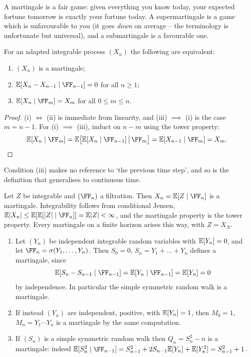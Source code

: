 \documentclass[a4paper]{scrartcl}
\begin{document}
A martingale is a fair game: given everything you know today, your expected fortune tomorrow is exactly your fortune today. A supermartingale is a game which is unfavourable to you (it goes \emph{down} on average -- the terminology is unfortunate but universal), and a submartingale is a favourable one.

\begin{proposition}\label{prop:mart-equiv}
	For an adapted integrable process $(X_n)$ the following are equivalent:
	\begin{enumerate}[label=(\roman*)]
		\item $(X_n)$ is a martingale;
		\item $\EE[X_n - X_{n-1}\mid\FF_{n-1}] = 0$ for all $n \geq 1$;
		\item $\EE[X_n\mid\FF_m] = X_m$ for all $0 \leq m \leq n$.
	\end{enumerate}
\end{proposition}

\begin{proof}
	(i) $\iff$ (ii) is immediate from linearity, and (iii) $\implies$ (i) is the case $m = n-1$. For (i) $\implies$ (iii), induct on $n - m$ using the tower property:
	$$
	\EE[X_{n}\mid\FF_m] = \EE\big[\EE[X_{n}\mid\FF_{n-1}]\,\big|\,\FF_m\big] = \EE[X_{n-1}\mid\FF_m] = X_m. \qedhere
	$$
\end{proof}

Condition (iii) makes no reference to `the previous time step', and so is the definition that generalises to continuous time.

\begin{example}
	Let $Z$ be integrable and $(\FF_n)$ a filtration. Then $X_n = \EE[Z\mid\FF_n]$ is a martingale. Integrability follows from conditional Jensen, $\EE|X_n| \leq \EE[\EE[|Z|\mid\FF_n]] = \EE|Z| < \infty$, and the martingale property is the tower property. Every martingale on a finite horizon arises this way, with $Z = X_N$.
\end{example}

\begin{example}
	\begin{enumerate}[label=(\roman*)]
		\item Let $(Y_n)$ be independent integrable random variables with $\mathbb{E}[Y_n] = 0$, and let $\FF_n = \sigma(Y_1,\dots,Y_n)$. Then $S_0 = 0$, $S_n = Y_1 + \dots + Y_n$ defines a martingale, since
		$$
		\EE[S_n - S_{n-1}\mid\FF_{n-1}] = \EE[Y_n\mid\FF_{n-1}] = \EE[Y_n] = 0
		$$
		by independence. In particular the simple symmetric random walk is a martingale.
		\item If instead $(Y_n)$ are independent, positive, with $\mathbb{E}[Y_n]=1$, then $M_0 = 1$, $M_n = Y_1\cdots Y_n$ is a martingale by the same computation.
		\item If $(S_n)$ is a simple symmetric random walk then $Q_n = S_n^2 - n$ is a martingale: indeed $\EE[S_n^2\mid\FF_{n-1}] = S_{n-1}^2 + 2S_{n-1}\EE[Y_n] + \EE[Y_n^2] = S_{n-1}^2 + 1$.
	\end{enumerate}
\end{example}
\end{document}
